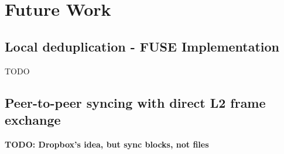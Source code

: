 
\chapter{Future Work}



\section{Local deduplication - FUSE Implementation}
TODO

\section{Peer-to-peer syncing with direct L2 frame exchange}
  {\color{red}\textbf{TODO: Dropbox's idea, but sync blocks, not files}}